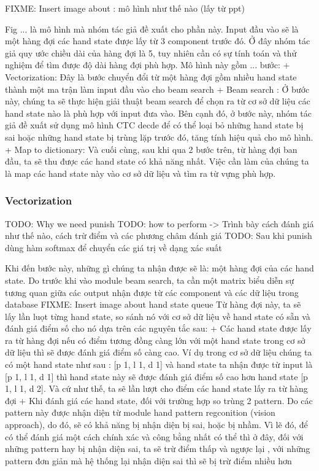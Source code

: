 FIXME: Insert image about : mô hình như thế nào (lấy từ ppt)

Fig ... là mô hình mà nhóm tác giả đề xuất cho phần này. Input đầu vào
sẽ là một hàng đợi các hand state được lấy từ 3 component trước đó. Ở đây nhóm tác giả
quy ước chiều dài của hàng đợi là 5, tuy nhiên cần có sự tính toán và thử nghiệm để tìm
được độ dài hàng đợi phù hợp.
Mô hình này gồm ... bước:
+ Vectorization: Đây là bước chuyển đổi từ một hàng đợi gồm nhiều hand state thành
một ma trận làm input đầu vào cho beam search
+ Beam search : Ở bước này, chúng ta sẽ thực hiện giải thuật beam search để chọn ra
từ cơ sở dữ liệu các hand state nào là phù hợp với input đưa vào. Bên cạnh đó, ở bước
này, nhóm tác giả đề xuất sử dụng mô hình CTC decde để có thể loại bỏ những hand state bị sai
hoặc những hand state bị trùng lặp trước đó, tăng tính hiệu quả cho mô hình.
+ Map to dictionary: Và cuối cùng, sau khi qua 2 bước trên, từ hàng đợi ban đầu, ta sẽ
thu được các hand state có khả năng nhất. Việc cần làm của chúng ta là map các hand state
này vào cơ sở dữ liệu và tìm ra từ vựng phù hợp.
      
\subsubsection{ Vectorization }
TODO: Why we need punish
TODO: how to perform -> Trình bày cách đánh giá như thế nào, cách trừ điểm và các phương châm đánh giá
TODO: Sau khi punish dùng hàm softmax để chuyển các giá trị về dạng xác suất

Khi đến bước này, những gì chúng ta nhận được sẽ là: một hàng đợi của các hand state.
Do trước khi vào module beam search, ta cần một matrix biểu diễn sự tương quan giữa các output nhận được từ các component và các dữ liệu trong database
FIXME: Insert image about hand state queue
Từ hàng đợi này, ta sẽ lấy lần luọt từng hand state, so sánh nó với cơ sở dữ liệu về hand state có sẵn 
và đánh giá điểm số cho nó dựa trên các nguyên tắc sau:
+ Các hand state được lấy ra từ hàng đợi nếu có điểm tương đồng càng lớn với một hand state
trong cơ sở dữ liệu thì sẽ được đánh giá điểm số càng cao. Ví dụ trong cơ sở dữ liệu chúng ta
có một hand state như sau : [p 1, l 1, d 1] và hand state ta nhận được từ input là [p 1, l 1, d 1] thì hand state này sẽ
được đánh giá điểm số cao hơn hand state [p 1, l 1, d 2]. Và cứ như thế, ta sẽ lần lượt cho điểm các hand state lấy ra từ hàng đợi
+ Khi đánh giá các hand state, đối với trường hợp so trùng 2 pattern. Do các pattern này được nhận diện từ module
hand pattern regconition (vision approach), do đó, sẽ có khả năng bị nhận diện bị sai, hoặc bị nhầm. Vì lẽ đó, để có thể
đánh giá một cách chính xác và công bằng nhất có thể thì ở đây, đối với những pattern hay bị nhận diện sai, ta sẽ trừ điểm thấp và ngược lại
, với những pattern đơn giản mà hệ thống lại nhận diện sai thì sẽ bị trừ điểm nhiều hơn
      
